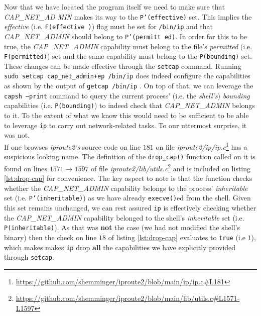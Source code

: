         Now that we have located the program itself we need to make sure that \textit{CAP\_NET\_AD MIN} makes its way to the \texttt{P'(effective)} set. This implies the \textit{effective} (i.e. \texttt{F(effective )}) flag must be set for \texttt{/bin/ip} and that \textit{CAP\_NET\_ADMIN} should belong to \texttt{P'(permitt ed)}. In order for this to be true, the \textit{CAP\_NET\_ADMIN} capability must belong to the file's \textit{permitted} (i.e. \texttt{F(permitted)}) set and the same capability must belong to the \texttt{P(bounding)} set.\\

        These changes can be made effective through the \texttt{setcap} \cite{bib:man-setcap} command. Running \texttt{sudo setcap cap\_net\_admin+ep /bin/ip} does indeed configure the capabilities as shown by the output of \texttt{getcap /bin/ip} \cite{bib:man-getcap}. On top of that, we can leverage the \texttt{capsh --print} \cite{bib:man-capsh} command to query the current process' (i.e. the \textit{shell's}) \textit{bounding} capabilities (i.e. \texttt{P(bounding)}) to indeed check that \textit{CAP\_NET\_ADMIN} belongs to it. To the extent of what we know this would need to be sufficient to be able to leverage \texttt{ip} to carry out network-related tasks. To our uttermost surprise, it was not.\\

        If one browses \textit{iproute2's} source code on \cite{bib:iproute2-src} line $181$ on file \textit{iproute2/ip/ip.c}\footnote{\url{https://github.com/shemminger/iproute2/blob/main/ip/ip.c\#L181}} has a suspicious looking name. The definition of the \texttt{drop\_cap()} function called on it is found on lines $1571 \to 1597$ of file \textit{iproute2/lib/utils.c}\footnote{\url{https://github.com/shemminger/iproute2/blob/main/lib/utils.c\#L1571-L1597}} and is included on listing \ref{lst:drop-cap} for convenience. The key aspect to note is that the function checks whether the \textit{CAP\_NET\_ADMIN} capability belongs to the process' \textit{inheritable} set (i.e. \texttt{P'(inheritable)}) as we have already \texttt{execve()}ed from the shell. Given this set remains unchanged, we can rest assured \texttt{ip} is effectively checking whether the \textit{CAP\_NET\_ADMIN} capability belonged to the shell's \textit{inheritable} set (i.e. \texttt{P(inheritable)}). As that was \textbf{not} the case (we had not modified the shell's binary) then the check on line $18$ of listing \ref{lst:drop-cap} evaluates to \texttt{true} (i.e $1$), which makes makes \texttt{ip} drop \textbf{all} the capabilities we have explicitly provided through \texttt{setcap}.\\

